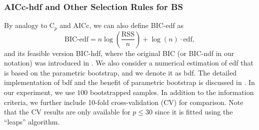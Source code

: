 \subsubsection{AICc-hdf and Other Selection Rules for BS}
\label{sec:bs_ic_simulationresults}
By analogy to C$_p$ and AICc, we can also define BIC-edf as
\begin{equation}
\text{BIC-edf} = n \log\left(\frac{\text{RSS}}{n}\right) + \log(n) \cdot \text{edf},
\label{eq:bic_edf}
\end{equation}
and its feasible version BIC-hdf, where the original BIC (or BIC-ndf in our notation) was introduced in \citet{schwarz1978estimating}. We also consider a numerical estimation of edf that is based on the parametric bootstrap, and we denote it as bdf. The detailed implementation of bdf and the benefit of parametric bootstrap is discussed in \citet{Efron2004}. In our experiment, we use $100$ bootstrapped samples. In addition to the information criteria, we further include 10-fold cross-validation (CV) for comparison. Note that the CV results are only available for $p \le 30$ since it is fitted using the ``leaps'' algorithm.

